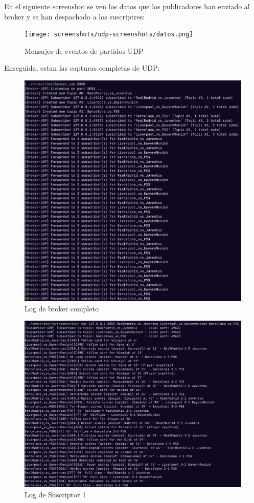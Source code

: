 \documentclass[10pt]{article}
\begin{document}
En el siguiente screenshot se ven los datos que los publicadores han enviado al broker y se han despachado a los suscriptres:

\begin{figure}[H]
    \centering
    \texttt{[image: screenshots/udp-screenshots/datos.png]}
    \caption{Mensajes de eventos de partidos UDP}
\end{figure} 

Enseguida, estan las capturas completas de UDP:

\begin{figure}[H]
    \centering
    \includegraphics[width=.85\textwidth]{screenshots/udp-screenshots/broker.png}
    \caption{Log de broker completo}
\end{figure} 


\begin{figure}[H]
    \centering
    \includegraphics[width=.85\textwidth]{screenshots/udp-screenshots/sub1.png}
    \caption{Log de Suscriptor 1}
\end{figure} 
\end{document}
